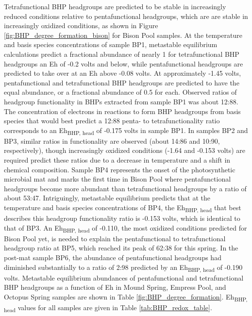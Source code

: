 Tetrafunctional BHP headgroups are predicted to be stable in increasingly reduced conditions relative to pentafunctional headgroups, which are are stable in increasingly oxidized conditions, as shown in Figure \ref{fig:BHP_degree_formation_bison} for Bison Pool samples. At the temperature and basis species concentrations of sample BP1, metastable equilibrium calculations predict a fractional abundance of nearly 1 for tetrafunctional BHP headgroups an Eh of -0.2 volts and below, while pentafunctional headgroups are predicted to take over at an Eh above -0.08 volts. At approximately -1.45 volts, pentafunctional and tetrafunctional BHP headgroups are predicted to have the equal abundance, or a fractional abundance of 0.5 for each. Observed ratios of headgroup functionality in BHPs extracted from sample BP1 was about 12:88. The concentration of electrons in reactions to form BHP headgroups from basis species that would best predict a 12:88 penta- to tetrafunctionality ratio corresponds to an Eh\textsubscript{BHP, head} of -0.175 volts in sample BP1. In samples BP2 and BP3, similar ratios in functionality are observed (about 14:86 and 10:90, respectively), though increasingly oxidized conditions (-1.64 and -0.153 volts) are required predict these ratios due to a decrease in temperature and a shift in chemical composition. Sample BP4 represents the onset of the photosynthetic microbial mat and marks the first time in Bison Pool where pentafunctional headgroups become more abundant than tetrafunctional headgroups by a ratio of about 53:47. Intriguingly, metastable equilibrium predicts that at the temperature and basis species concentrations of BP4, the Eh\textsubscript{BHP, head} that best describes this headgroup functionality ratio is -0.153 volts, which is identical to that of BP3. An Eh\textsubscript{BHP, head} of -0.110, the most oxidized conditions predicted for Bison Pool yet, is needed to explain the pentafunctional to tetrafunctional headgroup ratio at BP5, which reached its peak of 62:38 for this spring. In the post-mat sample BP6, the abundance of pentafunctional headgroups had diminished substantially to a ratio of 2:98 predicted by an Eh\textsubscript{BHP, head} of -0.190 volts. Metastable equilibrium abundances of pentafunctional and tetrafunctional BHP headgroups as a function of Eh in Mound Spring, Empress Pool, and Octopus Spring samples are shown in Table \ref{fig:BHP_degree_formation}. Eh\textsubscript{BHP, head} values for all samples are given in Table \ref{tab:BHP_redox_table}.

